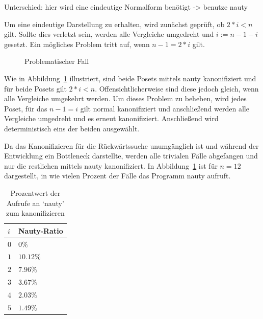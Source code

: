 \documentclass[10pt,journal,compsoc]{IEEEtran}
\begin{document}
Unterschied: hier wird eine eindeutige Normalform benötigt
-> benutze nauty

Um eine eindeutige Darstellung zu erhalten, wird zunächst geprüft, ob $2 * i < n$ gilt.
Sollte dies verletzt sein, werden alle Vergleiche umgedreht und $i := n - 1 - i$ gesetzt.
Ein mögliches Problem tritt auf, wenn $n - 1 = 2 * i$ gilt.
\begin{figure}
  \centering
  \caption{Problematischer Fall}
  \label{fig:backward_canonify_problematic}
\end{figure}
Wie in Abbildung~\ref{fig:backward_canonify_problematic} illustriert, sind beide Posets mittels nauty kanonifiziert und für beide Posets gilt  $2 * i < n$.
Offensichtlicherweise sind diese jedoch gleich, wenn alle Vergleiche umgekehrt werden.
Um dieses Problem zu beheben, wird jedes Poset, für das $n - 1 = i$ gilt normal kanonifiziert und anschließend werden alle Vergleiche umgedreht und es erneut kanonifiziert.
Anschließend wird deterministisch eins der beiden ausgewählt.

Da das Kanonifizieren für die Rückwärtssuche unumgänglich ist und während der Entwicklung ein Bottleneck darstellte, werden alle trivialen Fälle abgefangen und nur die restlichen mittels nauty kanonifiziert.
In Abbildung~\ref{table:nauty-ratio} ist für $n = 12$ dargestellt, in wie vielen Prozent der Fälle das Programm nauty aufruft.

\begin{table}
  \begin{tabular}{l|l}
    $i$ & Nauty-Ratio \\ %
    \hline
    $0$ & $0\%$       \\
    $1$ & $10.12\%$   \\
    $2$ & $7.96\%$    \\
    $3$ & $3.67\%$    \\
    $4$ & $2.03\%$    \\
    $5$ & $1.49\%$
  \end{tabular}
  \centering
  \caption{Prozentwert der Aufrufe an `nauty' zum kanonifizieren}
  \label{table:nauty-ratio}
\end{table}
\end{document}
